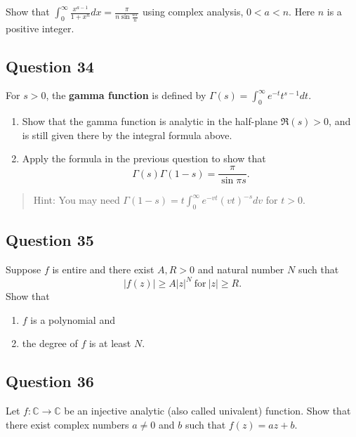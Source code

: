 \documentclass[12pt]{article}
\begin{document}
Show that
\(\displaystyle \int_0^\infty \frac{x^{a-1}}{1+x^n} dx=\frac{\pi}{n\sin \frac{a\pi}{n}}\)
using complex analysis, \(0< a < n\). Here \(n\) is a positive integer.

\hypertarget{question-34-2}{%
\subsection{Question 34}\label{question-34-2}}

For \(s>0\), the \textbf{gamma function} is defined by
\(\displaystyle{\Gamma(s)=\int_0^{\infty} e^{-t}t^{s-1} dt}\).

\begin{enumerate}
\def\labelenumi{\arabic{enumi}.}
\item
  Show that the gamma function is analytic in the half-plane
  \(\Re (s)>0\), and is still given there by the integral formula above.
\item
  Apply the formula in the previous question to show that
  \[\Gamma(s)\Gamma(1-s)=\frac{\pi}{\sin \pi s}.\]
\end{enumerate}

\begin{quote}
Hint: You may need
\(\displaystyle{\Gamma(1-s)=t \int_0^{\infty}e^{-vt}(vt)^{-s} dv}\) for
\(t>0\).
\end{quote}

\hypertarget{question-35-2}{%
\subsection{Question 35}\label{question-35-2}}

Suppose \(f\) is entire and there exist \(A, R >0\) and natural number
\(N\) such that \[|f(z)| \geq A |z|^N\ \text{for}\ |z| \geq R.\] Show
that

\begin{enumerate}
\def\labelenumi{(\roman{enumi})}
\item
  \(f\) is a polynomial and
\item
  the degree of \(f\) is at least \(N\).
\end{enumerate}

\hypertarget{question-36-2}{%
\subsection{Question 36}\label{question-36-2}}

Let \(f: {\mathbb C} \rightarrow {\mathbb C}\) be an injective analytic
(also called univalent) function. Show that there exist complex numbers
\(a \neq 0\) and \(b\) such that \(f(z) = az + b\).
\end{document}
